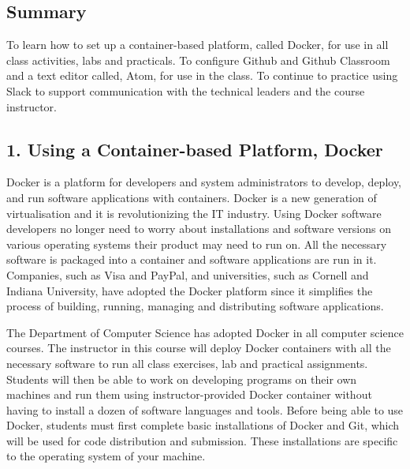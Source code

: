 
\newcommand{\command}[1]{``\lstinline{#1}''}
\newcommand{\program}[1]{\lstinline{#1}}
\newcommand{\channel}[1]{\lstinline{#1}}
\newcommand{\option}[1]{``{#1}''}
\newcommand{\step}[1]{``{#1}''}


\long{}



\subsection*{Summary}
To learn how to set up a container-based platform, called Docker, for use in all class activities, labs and practicals. To configure Github and Github Classroom and a text editor called, Atom, for use in the class. To continue to practice using Slack to support communication with the technical leaders and the course instructor.

\subsection*{1. Using a Container-based Platform, Docker}

Docker is a platform for developers and system administrators to develop, deploy, and run software applications with containers. Docker is a new generation of virtualisation and it is revolutionizing the IT industry. Using Docker software developers no longer need to worry about installations and software versions on various operating systems their product may need to run on. All the necessary software is packaged into a container and software applications are run in it. Companies, such as Visa and PayPal, and universities, such as Cornell and Indiana University, have adopted the Docker platform since it simplifies the process of building, running, managing and distributing software applications. 

\noindent The Department of Computer Science has adopted Docker in all computer science courses. The instructor in this course will deploy Docker containers with all the necessary software to run all class exercises, lab and practical assignments. Students will then be able to work on developing programs on their own machines and run them using instructor-provided Docker container without having to install a dozen of software languages and tools. Before being able to use Docker, students must first complete basic installations of Docker and Git, which will be used for code distribution and submission. These installations are specific to the operating system of your machine. 

